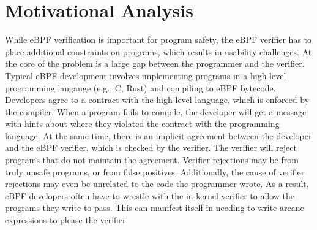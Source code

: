 \section{Motivational Analysis}
\label{sec:motivation}

While eBPF verification is important for program safety, the eBPF verifier has
    to place additional constraints on programs, which results in usability
    challenges.
At the core of the problem is a large gap between the programmer and the
    verifier.
Typical eBPF development involves implementing programs in a high-level
    programming langauge (e.g., C, Rust) and compiling to eBPF bytecode.
Developers agree to a contract with the high-level language, which is enforced by the compiler.
When a program fails to compile, the developer will get a message with hints about where they violated
    the contract with the programming language.
At the same time, there is an implicit agreement between the developer and the eBPF verifier, which is
    checked by the verifier.
The verifier will reject programs that do not maintain the agreement.
Verifier rejections may be from truly unsafe programs, or from false positives.
Additionally, the cause of verifier rejections may even be unrelated to the code the programmer wrote.
As a result, eBPF developers often have to wrestle with the in-kernel verifier
    to allow the programs they write to pass.
This can manifest itself in needing to write arcane expressions to please the
    verifier.


